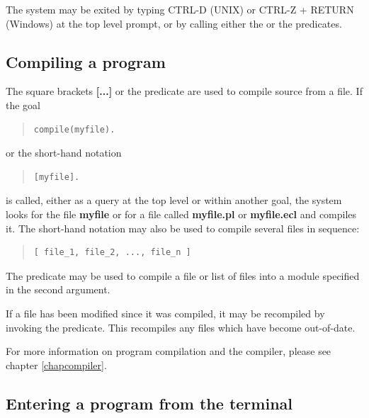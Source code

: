The {\eclipse} system may be exited by typing CTRL-D (UNIX) or
CTRL-Z + RETURN (Windows) at the top level prompt,
or by calling either the 
or the  predicates.

\subsection{Compiling a program}

The square brackets {\bf [...]} or the
 predicate are used
to compile {\eclipse} source from a file.
If the goal
\begin{quote}
\begin{verbatim}
compile(myfile).
\end{verbatim}
\end{quote}
or the short-hand notation
\begin{quote}
\begin{verbatim}
[myfile].
\end{verbatim}
\end{quote}
is called, either as a query at the top level or within another goal,
the system looks for the file {\bf myfile} or for a file called {\bf
myfile.pl} or {\bf myfile.ecl} and compiles it.
The short-hand notation may also be used to compile several files in
sequence:
\begin{quote}
\begin{verbatim}
[ file_1, file_2, ..., file_n ]
\end{verbatim}
\end{quote}
The  predicate may be used to compile a file or list of
files into a module specified in the second argument.

If a file has been modified since it was compiled, it may be recompiled by
invoking the  predicate.
This recompiles any files which have become out-of-date.

For more information on program compilation and the compiler, please see
chapter \ref{chapcompiler}.

\subsection{Entering a program from the terminal}

